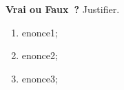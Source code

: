 \documentclass[exercice]{thedocument}%
\begin{document}
%
{\bfseries Vrai ou Faux~?} Justifier.
\begin{enumerate}
        \item \<enonce1;
        \item \<enonce2;
        \item \<enonce3;
\end{enumerate}
\end{document}
